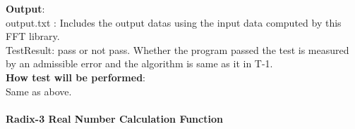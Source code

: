 \documentclass[12pt, titlepage]{article}
\begin{document}
\begin{enumerate}
					
\textbf {Output}: \\{\large output.txt} : Includes the output datas using the input data computed by this FFT library.\\
{\large TestResult}: pass or not pass. Whether the program passed the test is measured by an admissible error and the algorithm is same as it in T-1.\\

\textbf {How test will be performed}: \\
Same as above.
\end{enumerate}

\paragraph{Radix-3 Real Number Calculation Function\\}
\end{document}
